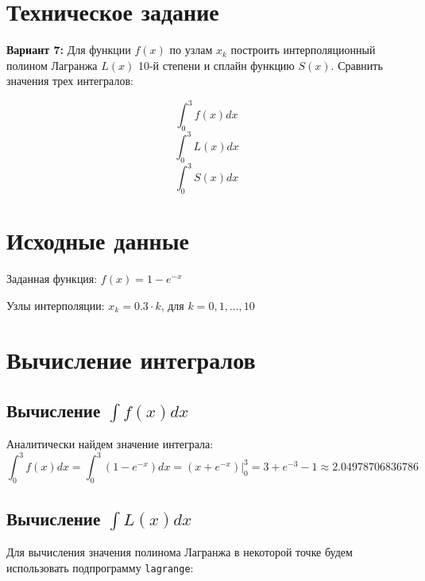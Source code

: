





\section{Техническое задание}

\textbf{Вариант 7:} Для функции $f(x)$ по узлам $x_k$ построить интерполяционный полином Лагранжа $L(x)$ 10-й степени и сплайн функцию $S(x)$. Сравнить значения трех интегралов:

\begin{multicols}{3}
	\noindent 
	\[\int_0^3 f(x)dx\]
	\[\int_0^3 L(x)dx\]
	\[\int_0^3 S(x)dx\]
\end{multicols}

\section{Исходные данные}

Заданная функция: $f(x) = 1 - e^{-x}$

\vspace{0.3cm}

Узлы интерполяции: $x_k = 0.3 \cdot k\text{, для }k = 0, 1, ..., 10$

\section{Вычисление интегралов}

\subsection{Вычисление $\int f(x)dx$}

Аналитически найдем значение интеграла:
\vspace{-0.2cm}
\[
\int_0^3 f(x)dx = \int_0^3 \left(1 - e^{-x}\right) dx = \left.\left( x + e^{-x} \right)\right\vert_0^3 = 3 + e^{-3} - 1 \approx 2.04978706836786
\]

\subsection{Вычисление $\int L(x)dx$}

\makeatletter
\def\lst@PlaceNumber{\llap{\normalfont
                \lst@numberstyle{\the\lst@lineno}\kern\lst@numbersep}}
\makeatother

Для вычисления значения полинома Лагранжа в некоторой точке будем использовать подпрограмму \texttt{lagrange}:

